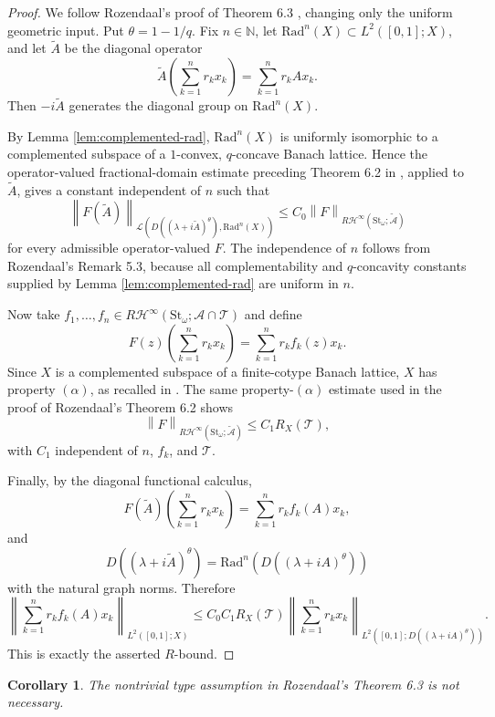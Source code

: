 \documentclass[11pt]{article}
\newtheorem{corollary}{Corollary}
\newcommand{\N}{\mathbb N}
\newcommand{\St}{\mathrm{St}}
\newcommand{\Rad}{\mathrm{Rad}}
\newcommand{\cL}{\mathcal L}
\newcommand{\cA}{\mathcal A}
\newcommand{\HT}{\mathcal H}
\newcommand{\norm}[1]{\left\|#1\right\|}
\begin{document}
\begin{proof}
We follow Rozendaal's proof of Theorem 6.3 \cite{Rozendaal}, changing only the
uniform geometric input.  Put \(\theta=1-1/q\).  Fix \(n\in\N\), let
\(\Rad^n(X)\subset L^2([0,1];X)\), and let \(\widetilde A\) be the diagonal
operator
\[
        \widetilde A\left(\sum_{k=1}^n r_k x_k\right)
        =\sum_{k=1}^n r_k A x_k .
\]
Then \(-i\widetilde A\) generates the diagonal group on \(\Rad^n(X)\).

By Lemma \ref{lem:complemented-rad}, \(\Rad^n(X)\) is uniformly isomorphic to a
complemented subspace of a \(1\)-convex, \(q\)-concave Banach lattice.  Hence
the operator-valued fractional-domain estimate preceding Theorem 6.2 in
\cite{Rozendaal}, applied to \(\widetilde A\), gives a constant independent of
\(n\) such that
\[
        \norm{F(\widetilde A)}_
        {\cL(D((\lambda+i\widetilde A)^\theta),\Rad^n(X))}
        \le C_0\norm{F}_{R\HT^\infty(\St_\omega;\widetilde{\cA})}
\]
for every admissible operator-valued \(F\).  The independence of \(n\) follows
from Rozendaal's Remark 5.3, because all complementability and \(q\)-concavity
constants supplied by Lemma \ref{lem:complemented-rad} are uniform in \(n\).

Now take \(f_1,\ldots,f_n\in R\HT^\infty(\St_\omega;\cA\cap\mathcal T)\) and
define
\[
        F(z)\left(\sum_{k=1}^n r_k x_k\right)
        =
        \sum_{k=1}^n r_k f_k(z)x_k .
\]
Since \(X\) is a complemented subspace of a finite-cotype Banach lattice, \(X\)
has property \((\alpha)\), as recalled in \cite{Rozendaal}.  The same
property-\((\alpha)\) estimate used in the proof of Rozendaal's Theorem 6.2
shows
\[
        \norm{F}_{R\HT^\infty(\St_\omega;\widetilde{\cA})}
        \le C_1 R_X(\mathcal T),
\]
with \(C_1\) independent of \(n\), \(f_k\), and \(\mathcal T\).

Finally, by the diagonal functional calculus,
\[
        F(\widetilde A)\left(\sum_{k=1}^n r_k x_k\right)
        =
        \sum_{k=1}^n r_k f_k(A)x_k,
\]
and
\[
        D((\lambda+i\widetilde A)^\theta)
        =
        \Rad^n\!\left(D((\lambda+iA)^\theta)\right)
\]
with the natural graph norms.  Therefore
\[
        \left\|\sum_{k=1}^n r_k f_k(A)x_k\right\|_{L^2([0,1];X)}
        \le
        C_0C_1 R_X(\mathcal T)
        \left\|\sum_{k=1}^n r_k x_k\right\|_
        {L^2([0,1];D((\lambda+iA)^\theta))}.
\]
This is exactly the asserted \(R\)-bound.
\end{proof}

\begin{corollary}
The nontrivial type assumption in Rozendaal's Theorem 6.3 is not necessary.
\end{corollary}
\end{document}

